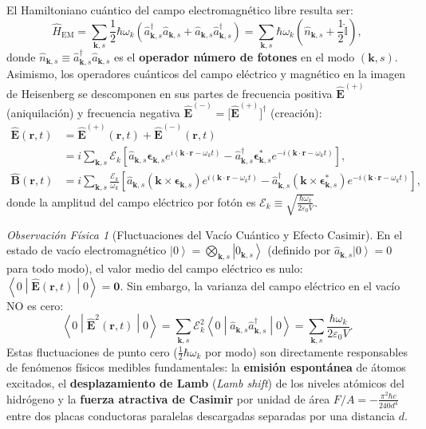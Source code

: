 \documentclass[11pt,a4paper,twoside]{report}
\theoremstyle{definition}
\theoremstyle{plain}
\theoremstyle{remark}
\newtheorem{observacion}{Observación Física}[chapter]
\newcommand{\ket}[1]{\left| #1 \right\rangle}
\newcommand{\mel}[3]{\left\langle #1 \middle| #2 \middle| #3 \right\rangle}
\newcommand{\op}[1]{\hat{#1}}
\newcommand{\ident}{\hat{\mathbb{I}}}
\begin{document}
El Hamiltoniano cuántico del campo electromagnético libre resulta ser:
\begin{equation}
    \op{H}_{\text{EM}} = \sum_{\bm{k},s} \frac{1}{2}\hbar\omega_k \left( \op{a}_{\bm{k},s}^\dagger \op{a}_{\bm{k},s} + \op{a}_{\bm{k},s} \op{a}_{\bm{k},s}^\dagger \right) = \sum_{\bm{k},s} \hbar\omega_k \left( \op{n}_{\bm{k},s} + \frac{1}{2}\ident \right),
\end{equation}
donde $\op{n}_{\bm{k},s} \equiv \op{a}_{\bm{k},s}^\dagger \op{a}_{\bm{k},s}$ es el \textbf{operador número de fotones} en el modo $(\bm{k},s)$. Asimismo, los operadores cuánticos del campo eléctrico y magnético en la imagen de Heisenberg se descomponen en sus partes de frecuencia positiva $\bm{\op{E}}^{(+)}$ (aniquilación) y frecuencia negativa $\bm{\op{E}}^{(-)} = \big[\bm{\op{E}}^{(+)}\big]^\dagger$ (creación):
\begin{align}
    \bm{\op{E}}(\bm{r},t) &= \bm{\op{E}}^{(+)}(\bm{r},t) + \bm{\op{E}}^{(-)}(\bm{r},t) \nonumber \\
    &= i\sum_{\bm{k},s} \mathcal{E}_k \left[ \op{a}_{\bm{k},s} \bm{\epsilon}_{\bm{k},s} e^{i(\bm{k}\cdot\bm{r} - \omega_k t)} - \op{a}_{\bm{k},s}^\dagger \bm{\epsilon}_{\bm{k},s}^* e^{-i(\bm{k}\cdot\bm{r} - \omega_k t)} \right], \\
    \bm{\op{B}}(\bm{r},t) &= i\sum_{\bm{k},s} \frac{\mathcal{E}_k}{\omega_k} \left[ \op{a}_{\bm{k},s} (\bm{k}\times\bm{\epsilon}_{\bm{k},s}) e^{i(\bm{k}\cdot\bm{r} - \omega_k t)} - \op{a}_{\bm{k},s}^\dagger (\bm{k}\times\bm{\epsilon}_{\bm{k},s}^*) e^{-i(\bm{k}\cdot\bm{r} - \omega_k t)} \right],
\end{align}
donde la amplitud del campo eléctrico por fotón es $\mathcal{E}_k \equiv \sqrt{\frac{\hbar\omega_k}{2\varepsilon_0 V}}$.

\begin{observacion}[Fluctuaciones del Vacío Cuántico y Efecto Casimir]
En el estado de vacío electromagnético $\ket{0} = \bigotimes_{\bm{k},s} \ket{0_{\bm{k},s}}$ (definido por $\op{a}_{\bm{k},s}\ket{0} = 0$ para todo modo), el valor medio del campo eléctrico es nulo: $\mel{0}{\bm{\op{E}}(\bm{r},t)}{0} = \bm{0}$. Sin embargo, la varianza del campo eléctrico en el vacío NO es cero:
\begin{equation}
    \mel{0}{\bm{\op{E}}^2(\bm{r},t)}{0} = \sum_{\bm{k},s} \mathcal{E}_k^2 \mel{0}{\op{a}_{\bm{k},s}\op{a}_{\bm{k},s}^\dagger}{0} = \sum_{\bm{k},s} \frac{\hbar\omega_k}{2\varepsilon_0 V}.
\end{equation}
Estas fluctuaciones de punto cero ($\frac{1}{2}\hbar\omega_k$ por modo) son directamente responsables de fenómenos físicos medibles fundamentales: la \textbf{emisión espontánea} de átomos excitados, el \textbf{desplazamiento de Lamb} (\textit{Lamb shift}) de los niveles atómicos del hidrógeno y la \textbf{fuerza atractiva de Casimir} por unidad de área $F/A = -\frac{\pi^2 \hbar c}{240 d^4}$ entre dos placas conductoras paralelas descargadas separadas por una distancia $d$.
\end{observacion}
\end{document}
